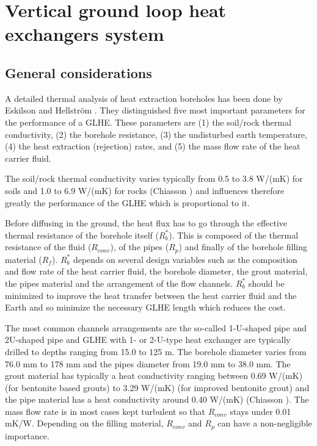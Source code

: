 \documentclass[a4paper,oneside,11pt]{report}
\begin{document}
\chapter{Vertical ground loop heat exchangers system} \label{chap:GLHE}


\section{General considerations} \label{sec:bf_con}

A detailed thermal analysis of heat extraction boreholes has been done by Eskilson \cite{esk87} and Hellstr\"om \cite{hel91}. They distinguished five most important parameters for the performance of a GLHE. These parameters are (1) the soil/rock thermal conductivity, (2) the borehole resistance, (3) the undisturbed earth temperature, (4) the heat extraction (rejection) rates, and (5) the mass flow rate of the heat carrier fluid.

The soil/rock thermal conductivity varies typically from 0.5 to 3.8 W/(mK) for soils and 1.0 to 6.9 W/(mK) for rocks (Chiasson \cite{chi07}) and influences therefore greatly the performance of the GLHE which is proportional to it.

Before diffusing in the ground, the heat flux has to go through the effective thermal resistance of the borehole itself ($R_b^*$). This is composed of the thermal resistance of the fluid ($R_{conv}$), of the pipes ($R_p$) and finally of the borehole filling material ($R_f$). $R_b^*$ depends on several design variables such as the composition and flow rate of the heat carrier fluid, the borehole diameter, the grout material, the pipes material and the arrangement of the flow channels. $R_b^*$ should be minimized to improve the heat transfer between the heat carrier fluid and the Earth and so minimize the necessary GLHE length which reduces the cost.

The most common channels arrangements are the so-called 1-U-shaped pipe and 2U-shaped pipe and GLHE with 1- or 2-U-type heat exchanger are typically drilled to depths ranging from 15.0 to 125 m. The borehole diameter varies from 76.0 mm to 178 mm and the pipes diameter from 19.0 mm to 38.0 mm. The grout material has typically a heat conductivity ranging between 0.69 W/(mK) (for bentonite based grouts) to 3.29 W/(mK) (for improved bentonite grout) and the pipe material has a heat conductivity around 0.40 W/(mK) (Chiasson \cite{chi07}). The mass flow rate is in most cases kept turbulent so that $R_{conv}$ stays under 0.01 mK/W. Depending on the filling material, $R_{conv}$ and $R_p$  can have a non-negligible importance.
\end{document}
